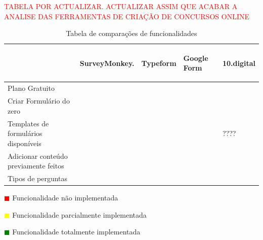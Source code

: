 \textcolor{red}{TABELA POR ACTUALIZAR. ACTUALIZAR ASSIM QUE ACABAR A ANALISE DAS FERRAMENTAS DE CRIAÇÃO DE CONCURSOS ONLINE}
	\renewcommand{\arraystretch}{2.5}
\setlength\arrayrulewidth{1.5pt}
\begin{table}[!ht]  
	\begin{center}
	\begin{tabular}{|p{4cm}|p{1.5cm}|p{1.5cm}|p{1.5cm}|p{1.5cm}|}
		\cline{2-5}
		\multicolumn{1}{c|}{} & \hspace{0.6cm}\begin{sideways}SurveyMonkey.\end{sideways} & \hspace{0.6cm}\begin{sideways}Typeform\end{sideways} & \hspace{0.6cm}\begin{sideways}Google Form\end{sideways} &\hspace{0.6cm}\begin{sideways} 10.digital\end{sideways}\\ \hline
		
		
			Plano Gratuito & \cellcolor{yellow!80}   & \cellcolor{yellow!80}  & \cellcolor{green!80} & \cellcolor{yellow!80}  \\ \hline
		
		Criar Formulário do zero & \cellcolor{green!80}  & \cellcolor{green!80}  & \cellcolor{green!80} & \cellcolor{green!80} \\ \hline
		
		Templates de formulários disponíveis& \cellcolor{green!80}  & \cellcolor{green!80} & \cellcolor{green!80} & ???? \\ \hline
		
		Adicionar conteúdo previamente feitos & \cellcolor{green!80}   & \cellcolor{red!80}  & \cellcolor{green!80} & \cellcolor{green!80}  \\ \hline
		
		Tipos de perguntas & \cellcolor{green!80}  & \cellcolor{green!80}  & \cellcolor{yellow!80} & \cellcolor{green!80}  \\ \hline
		
					
	\end{tabular}
\end{center}
		\hspace{1.2cm}	\textcolor{red}{$\blacksquare$} Funcionalidade não implementada
		
	   \hspace{1.2cm}     \textcolor{yellow}{$\blacksquare$} Funcionalidade parcialmente implementada
	   
	    \hspace{1.2cm}     \textcolor{green}{$\blacksquare$} Funcionalidade totalmente implementada 
	   \begin{center}
\caption{Tabela de comparações de funcionalidades}
\label{tab:comparacao1}
\end{center}
\end{table}

